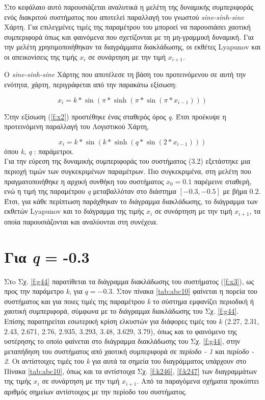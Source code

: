 Στο κεφάλαιο αυτό παρουσιάζεται αναλυτικά η μελέτη της δυναμικής συμπεριφοράς ενός διακριτού συστήματος που αποτελεί παραλλαγή του γνωστού \emph{sine-sinh-sine} Χάρτη. Για επιλεγμένες τιμές της παραμέτρου του μποροεί να παρουσιάσει χαοτική συμπεριφορά όπως και φαινόμενα που σχετίζονται με τη μη-γραμμική δυναμική. Για την μελέτη χρησιμοποιήθηκαν τα διαγράμματα διακλάδωσης, οι εκθέτες Lyapunov και οι απεικονίσεις της τιμής \(x_i\) σε συνάρτηση με  την τιμή \(x_{i+1}\).

Ο \emph{sine-sinh-sine} Χάρτης που αποτέλεσε τη βάση του προτεινόμενου σε αυτή την ενότητα, χάρτη, περιγράφεται από την παρακάτω εξίσωση:

\begin{equation}
	x_i=k*\sin(\pi*\sinh(\pi*\sin(\pi* x_{i-1})))
	\label{f:x2}
\end{equation}


Στην εξίσωση (\ref{f:x2}) προστέθηκε ένας σταθερός όρος \emph{q}. Έτσι προέκυψε η προτεινόμενη παραλλαγή του Λογιστικού Χάρτη,

\begin{equation}
	x_i=k*\sin(k*\sinh(q*\sin(2 * x_{i-1})))
	\label{f:x3}
\end{equation}
όπου \emph{k}, \emph{q} : παράμετροι.\\

Για την εύρεση της δυναμικής συμπεριφοράς του συστήματος (3.2) εξετάστηκε μια περιοχή τιμών των συγκεκριμένων παραμέτρων. Πιο συγκεκριμένα, στη μελέτη που πραγματοποιήθηκε η αρχική συνθήκη του συστήματος $x_0 =0.1$ παρέμεινε  σταθερή, ενώ η τιμή της παραμέτρου \emph{q} μεταβαλλόταν στο διάστημα $[-0.3,-0.5]$ με βήμα $0.2$. Έτσι, για κάθε περίπτωση παράχθηκαν το διάγραμμα διακλάδωσης, το διάγραμμα των εκθετών Lyapunov και το διάγραμμα της τιμής \(x_i\) σε συνάρτηση με  την τιμή \(x_{i+1}\), τα οποία παρουσιάζονται και αναλύονται στη συνέχεια.\\


\vspace{\fill}

\section{Για \emph{q} = -0.3}


Στo Σχ. \ref{f:g44} παρατίθεται τα διάγραμμα διακλάδωσης του συστήματος (\ref{f:x3}), ως προς την παράμετρο \emph{k}, για $q =- 0.3$. 
Στον πίνακα \ref{tab:abc10} φαίνεται η πορεία του συστήματος και για ποιες τιμές της παραμέτρου \emph{k} το σύστημα εμφανίζει περιοδική ή χαοτική συμπεριφορά, σύμφωνα με το διάγραμμα διακλάδωσης του Σχ. \ref{f:g44}. Επίσης παρατηρείται εσωτερική κρίση ελκυστών για διάφορες τιμές του \emph{k} (2.27, 2.31, 2.43, 2.671, 2.76, 2.935, 3.293, 3.48, 3.629, 3.79), όπως και το φαινόμενο της υστέρησης το οποίο φαίνεται στο διάγραμμα διακλάδωσης του Σχ. \ref{f:g44}, στην μεταπήδηση του συστήματος από χαοτική συμπεριφορά σε \emph{περίοδο - 1} και \emph{περίοδο - 2}. Οι αντίστοιχες τιμές του \emph{k} για αυτά τα σημεία του διαγράμματος υπάρχουν στο Πίνακα \ref{tab:abc10}, όπως και τα αντίστοιχα Σχ. \ref{f:k246}, \ref{f:k247} των διαγραμμάτων της τιμής \(x_i\) σε συνάρτηση με την τιμή \(x_{i+1}\). Από τα παραγόμενα σχήματα προκύπτει αριθμός σημείων αντίστοιχος με την περίοδο του συστήματος.

